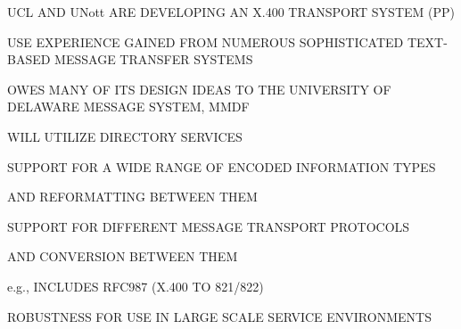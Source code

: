 \begin{bwslide}

\begin{nrtc}
\item	UCL AND UNott ARE DEVELOPING AN X.400 TRANSPORT SYSTEM (PP)

\item	USE EXPERIENCE GAINED FROM NUMEROUS SOPHISTICATED TEXT-BASED MESSAGE
	TRANSFER SYSTEMS

\item	OWES MANY OF ITS DESIGN IDEAS TO THE UNIVERSITY OF DELAWARE MESSAGE
	SYSTEM, MMDF

\item	WILL UTILIZE DIRECTORY SERVICES
\end{nrtc}
\end{bwslide}


\begin{bwslide}

\begin{nrtc}
\item	SUPPORT FOR A WIDE RANGE OF ENCODED INFORMATION TYPES 
    \begin{nrtc}
    \item	AND REFORMATTING BETWEEN THEM
    \end{nrtc}

\item	SUPPORT FOR DIFFERENT MESSAGE TRANSPORT PROTOCOLS
    \begin{nrtc}
    \item	AND CONVERSION BETWEEN THEM
    \end{nrtc}
    e.g., INCLUDES RFC987 (X.400 TO 821/822)

\item	ROBUSTNESS FOR USE IN LARGE SCALE SERVICE ENVIRONMENTS
\end{nrtc}
\end{bwslide}


